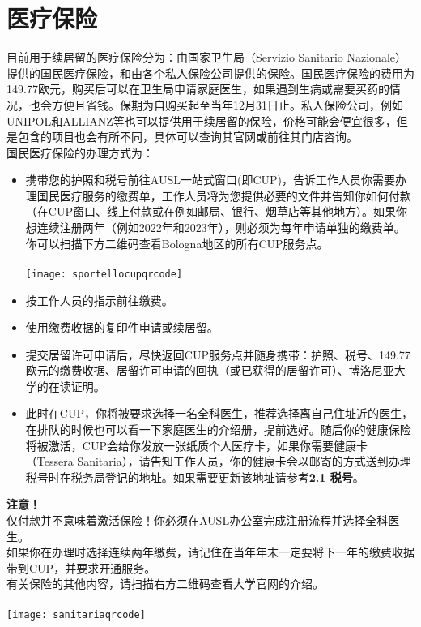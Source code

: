 \section{医疗保险}
目前用于续居留的医疗保险分为：由国家卫生局（Servizio Sanitario Nazionale）提供的国民医疗保险，和由各个私人保险公司提供的保险。国民医疗保险的费用为149.77欧元，购买后可以在卫生局申请家庭医生，如果遇到生病或需要买药的情况，也会方便且省钱。保期为自购买起至当年12月31日止。私人保险公司，例如UNIPOL和ALLIANZ等也可以提供用于续居留的保险，价格可能会便宜很多，但是包含的项目也会有所不同，具体可以查询其官网或前往其门店咨询。\\
国民医疗保险的办理方式为：
\begin{itemize}
\item 携带您的护照和税号前往AUSL一站式窗口(即CUP)，告诉工作人员你需要办理国民医疗服务的缴费单，工作人员将为您提供必要的文件并告知你如何付款（在CUP窗口、线上付款或在例如邮局、银行、烟草店等其他地方）。如果你想连续注册两年（例如2022年和2023年），则必须为每年申请单独的缴费单。你可以扫描下方二维码查看Bologna地区的所有CUP服务点。\\
\\
\texttt{[image: sportellocupqrcode]}
\item 按工作人员的指示前往缴费。
\item 使用缴费收据的复印件申请或续居留。
\item 提交居留许可申请后，尽快返回CUP服务点并随身携带：护照、税号、149.77 欧元的缴费收据、居留许可申请的回执（或已获得的居留许可）、博洛尼亚大学的在读证明。
\item 此时在CUP，你将被要求选择一名全科医生，推荐选择离自己住址近的医生，在排队的时候也可以看一下家庭医生的介绍册，提前选好。随后你的健康保险将被激活，CUP会给你发放一张纸质个人医疗卡，如果你需要健康卡（Tessera Sanitaria），请告知工作人员，你的健康卡会以邮寄的方式送到办理税号时在税务局登记的地址。如果需要更新该地址请参考\textbf{2.1 税号}。
\end{itemize}
\textbf{注意！}\\
仅付款并不意味着激活保险！你必须在AUSL办公室完成注册流程并选择全科医生。\\
如果你在办理时选择连续两年缴费，请记住在当年年末一定要将下一年的缴费收据带到CUP，并要求开通服务。\\
有关保险的其他内容，请扫描右方二维码查看大学官网的介绍。\\
\\
\texttt{[image: sanitariaqrcode]}

